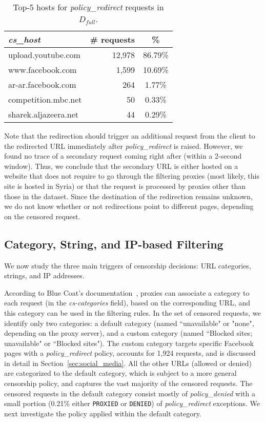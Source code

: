 \documentclass{sig-alternate-2013}
\newcommand{\descr}[1]{\smallskip\noindent{\bf #1}}
\def\df{$D_{full}$\xspace}
\newcommand{\policydenied}{\emph{policy\_denied}\xspace}
\newcommand{\policyredirect}{\emph{policy\_redirect}\xspace}
\begin{document}
\begin{table}[t!]
\centering
\small
\begin{tabular}{|l|r|c|} \hline
 {\bf\em cs\_host} &    {\bf \# requests} & \% \\ \hline
upload.youtube.com   &   12,978 & 86.79\% \\ www.facebook.com     &   1,599 & 10.69\% \\  ar-ar.facebook.com  &   264 & 1.77\% \\  competition.mbc.net &   50 & 0.33\% \\ 
 sharek.aljazeera.net &  44 & 0.29\%  \\ 
\hline
 \end{tabular} 
\caption{Top-5 hosts for \policyredirect requests in \df.}
\label{tab:policy_redirect_hosts}
\end{table} 



 
Note that the redirection should trigger an additional request from the client to the redirected URL immediately after \policyredirect is raised. However, we found no trace of a secondary request coming right after (within a 2-second window). Thus, we conclude that the secondary URL is either hosted on a website that does not require to go through the filtering proxies (most likely, this site is hosted in Syria) or that the request is processed by proxies other than those in the dataset. 
Since the destination of the redirection remains unknown, we do not know whether or not redirections point to different pages, depending on the censored request.




\subsection{Category, String, and IP-based Filtering}
\label{subsec:cat_string_ip_censorship}
We now study the three main triggers of censorship decisions: URL categories, strings, and IP addresses. 


\descr{Category-based Filtering.} According to Blue Coat's documentation~\cite{wikileaks}, proxies can associate a category to each request (in the {\em cs-categories} field), based on the corresponding URL, and this category can be used in the filtering rules.    
In the set of censored requests, we identify only two categories: a default category (named ``unavailable" or "none", depending on the proxy server), and a custom category (named ``Blocked sites; unavailable" or ``Blocked sites"). The custom category targets specific Facebook pages with a \policyredirect policy, accounts for 1,924 requests, and is discussed in detail in Section~\ref{sec:social_media}. All the other URLs (allowed or denied) are categorized to the default category, which is subject to a more general censorship policy, and captures the vast majority of the censored requests. The censored requests in the default category consist mostly of \policydenied  with a small portion (0.21\% either \texttt{PROXIED} or \texttt{DENIED}) of \policyredirect exceptions. We next investigate the policy applied within the default category.
\end{document}
